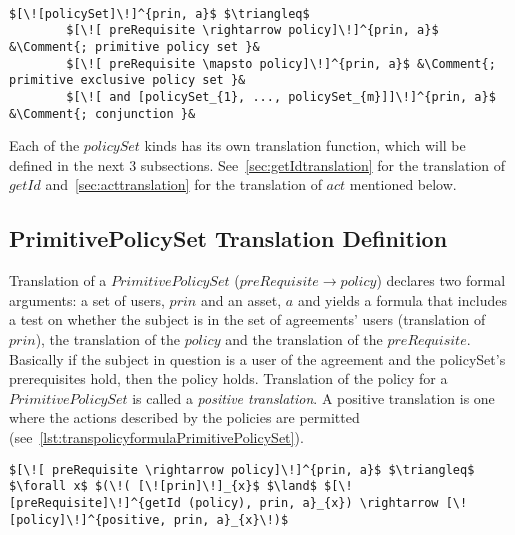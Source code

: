 \lstset{mathescape, language=AST}  
\begin{lstlisting}[frame=single, caption={Policy Set Translation Definition},label={lst:transpolicysetdefinitionAST}]

$[\![policySet]\!]^{prin, a}$ $\triangleq$ 
        $[\![ preRequisite \rightarrow policy]\!]^{prin, a}$ &\Comment{; primitive policy set }&
        $[\![ preRequisite \mapsto policy]\!]^{prin, a}$ &\Comment{; primitive exclusive policy set }&
        $[\![ and [policySet_{1}, ..., policySet_{m}]]\!]^{prin, a}$ &\Comment{; conjunction }&

\end{lstlisting}


Each of the $policySet$ kinds has its own translation function, which will be defined in the next 3 subsections. See~\ref{sec:getIdtranslation} for the translation of $getId$ and~\ref{sec:acttranslation} for the translation of $act$ mentioned below.


\subsection{PrimitivePolicySet Translation Definition}
Translation of a $PrimitivePolicySet$ ($preRequisite \rightarrow policy$) declares two formal arguments: a set of users, $prin$ and an asset, $a$ and yields a formula that includes a test on whether the subject is in the set of agreements' users (translation of $prin$), the translation of the $policy$ and the translation of the $preRequisite$. Basically if the subject in question is a user of the agreement and the policySet's prerequisites hold, then the policy holds. Translation of the policy for a $PrimitivePolicySet$ is called a \emph{positive translation}. A positive translation is one where the actions described by the policies are permitted (see~\ref{lst:transpolicyformulaPrimitivePolicySet}).   

\lstset{mathescape, language=AST}  
\begin{lstlisting}[frame=single, caption={Policy Set Translation Definition {$\colon$} PrimitivePolicySet},label={lst:transpolicyformulaPrimitivePolicySet}]
$[\![ preRequisite \rightarrow policy]\!]^{prin, a}$ $\triangleq$ $\forall x$ $(\!( [\![prin]\!]_{x}$ $\land$ $[\![preRequisite]\!]^{getId (policy), prin, a}_{x}) \rightarrow [\![policy]\!]^{positive, prin, a}_{x}\!)$
\end{lstlisting}





